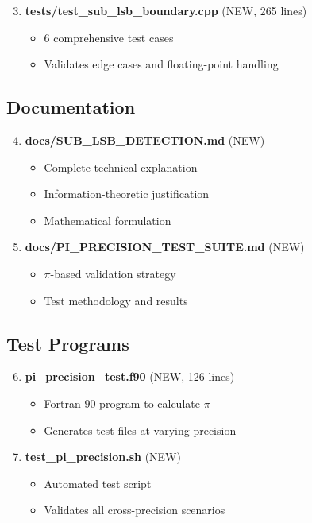 \documentclass[11pt]{article}
\begin{document}
\begin{enumerate}
    \setcounter{enumi}{2}
    \item \textbf{tests/test\_sub\_lsb\_boundary.cpp} (NEW, 265 lines)
    \begin{itemize}
        \item 6 comprehensive test cases
        \item Validates edge cases and floating-point handling
    \end{itemize}
\end{enumerate}

\subsection{Documentation}

\begin{enumerate}
    \setcounter{enumi}{3}
    \item \textbf{docs/SUB\_LSB\_DETECTION.md} (NEW)
    \begin{itemize}
        \item Complete technical explanation
        \item Information-theoretic justification
        \item Mathematical formulation
    \end{itemize}

    \item \textbf{docs/PI\_PRECISION\_TEST\_SUITE.md} (NEW)
    \begin{itemize}
        \item $\pi$-based validation strategy
        \item Test methodology and results
    \end{itemize}
\end{enumerate}

\subsection{Test Programs}

\begin{enumerate}
    \setcounter{enumi}{5}
    \item \textbf{pi\_precision\_test.f90} (NEW, 126 lines)
    \begin{itemize}
        \item Fortran 90 program to calculate $\pi$
        \item Generates test files at varying precision
    \end{itemize}

    \item \textbf{test\_pi\_precision.sh} (NEW)
    \begin{itemize}
        \item Automated test script
        \item Validates all cross-precision scenarios
    \end{itemize}
\end{enumerate}
\end{document}
